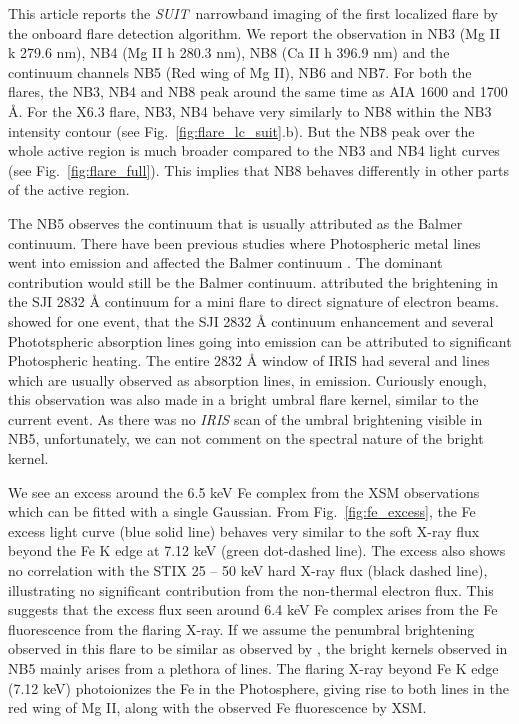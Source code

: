 \documentclass[12pt]{article}
\newcommand{\suit}{{\it{SUIT}}}
\begin{document}
This article reports the \suit~narrowband imaging of the first localized flare by the onboard flare detection algorithm. We report the observation in NB3 (Mg II k 279.6 nm), NB4 (Mg II h 280.3 nm), NB8 (Ca II h 396.9 nm) and the continuum channels NB5 (Red wing of Mg II), NB6 and NB7. For both the flares, the NB3, NB4 and NB8 peak around the same time as AIA 1600 and 1700 {\AA}. For the X6.3 flare, NB3, NB4 behave very similarly to NB8 within the NB3 intensity contour (see Fig.~\ref{fig:flare_lc_suit}.b). But the NB8 peak over the whole active region is much broader compared to the NB3 and NB4 light curves (see Fig.~\ref{fig:flare_full}). This implies that NB8 behaves differently in other parts of the active region.

The NB5 observes the continuum that is usually attributed as the Balmer continuum. There have been previous studies where Photospheric metal lines went into emission and affected the Balmer continuum \citep{heinzel14,kleint17}. The dominant contribution would still be the Balmer continuum. \cite{reetika21} attributed the brightening in the SJI 2832 {\AA} continuum for a mini flare to direct signature of electron beams. \cite{kowalski19} showed for one event, that the SJI 2832 {\AA} continuum enhancement and several Phototspheric absorption lines going into emission can be attributed to significant Photospheric heating. The entire 2832 {\AA} window of IRIS had several  and  lines which are usually observed as absorption lines, in emission. Curiously enough, this observation was also made in a bright umbral flare kernel, similar to the current event. As there was no {\it IRIS} scan of the umbral brightening visible in NB5, unfortunately, we can not comment on the spectral nature of the bright kernel.

We see an excess around the 6.5 keV Fe complex from the XSM observations which can be fitted with a single Gaussian. From Fig.~\ref{fig:fe_excess}, the Fe excess light curve (blue solid line) behaves very similar to the soft X-ray flux beyond the Fe K edge at 7.12 keV (green dot-dashed line). The excess also shows no correlation with the STIX 25 {--} 50 keV hard X-ray flux (black dashed line), illustrating no significant contribution from the non-thermal electron flux. This suggests that the excess flux seen around 6.4 keV Fe complex arises from the Fe fluorescence from the flaring X-ray. If we assume the penumbral brightening observed in this flare to be similar as observed by \cite{kowalski19}, the bright kernels observed in NB5 mainly arises from a plethora of  lines. The flaring X-ray beyond Fe K edge (7.12 keV) photoionizes the Fe in the Photosphere, giving rise to both  lines in the red wing of Mg II, along with the observed Fe fluorescence by XSM. 
\end{document}

